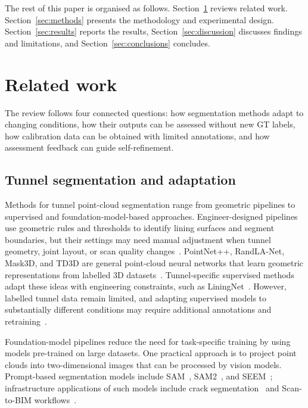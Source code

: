\documentclass[a4paper,fleqn]{cas-dc}
\begin{document}
The rest of this paper is organised as follows. Section~\ref{sec:related} reviews related work. Section~\ref{sec:methods} presents the methodology and experimental design. Section~\ref{sec:results} reports the results, Section~\ref{sec:discussion} discusses findings and limitations, and Section~\ref{sec:conclusions} concludes.

\section{Related work}
\label{sec:related}

The review follows four connected questions: how segmentation methods adapt to changing conditions, how their outputs can be assessed without new GT labels, how calibration data can be obtained with limited annotations, and how assessment feedback can guide self-refinement.

\subsection{Tunnel segmentation and adaptation}

Methods for tunnel point-cloud segmentation range from geometric pipelines to supervised and foundation-model-based approaches. Engineer-designed pipelines use geometric rules and thresholds to identify lining surfaces and segment boundaries, but their settings may need manual adjustment when tunnel geometry, joint layout, or scan quality changes~\cite{huang2021bim,weidner2024generalized,wang2025automated}. PointNet++, RandLA-Net, Mask3D, and TD3D are general point-cloud neural networks that learn geometric representations from labelled 3D datasets~\cite{qi2017pointnet,hu2020randla,schult2023mask3d,kolodiazhnyi2024td3d}. Tunnel-specific supervised methods adapt these ideas with engineering constraints, such as LiningNet~\cite{lin2025liningnet}. However, labelled tunnel data remain limited, and adapting supervised models to substantially different conditions may require additional annotations and retraining~\cite{su2024review, cha2024deep}.

Foundation-model pipelines reduce the need for task-specific training by using models pre-trained on large datasets. One practical approach is to project point clouds into two-dimensional images that can be processed by vision models. Prompt-based segmentation models include SAM~\cite{kirillov2023sam}, SAM2~\cite{ravi2024sam2}, and SEEM~\cite{zou2023segment}; infrastructure applications of such models include crack segmentation~\cite{ge2024cracksam,ye2024sam} and Scan-to-BIM workflows~\cite{wang2024omni,pan2024zero,ye2026maintenance}. 
\end{document}

